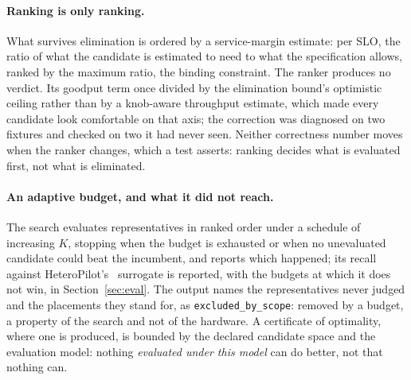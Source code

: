 \paragraph{Ranking is only ranking.}
What survives elimination is ordered by a service-margin estimate: per SLO,
the ratio of what the candidate is estimated to need to what the specification
allows, ranked by the maximum ratio, the binding constraint. The ranker
produces no verdict. Its goodput term once divided by the elimination bound's
optimistic ceiling rather than by a knob-aware throughput estimate, which made
every candidate look comfortable on that axis; the correction was diagnosed on
two fixtures and checked on two it had never seen. Neither correctness number
moves when the ranker changes, which a test asserts: ranking decides what is
evaluated first, not what is eliminated.

\paragraph{An adaptive budget, and what it did not reach.}
The search evaluates representatives in ranked order under a schedule of
increasing $K$, stopping when the budget is exhausted or when no unevaluated
candidate could beat the incumbent, and reports which happened; its recall
against HeteroPilot's~\cite{heteropilot} surrogate is reported, with the budgets at
which it does not win, in Section~\ref{sec:eval}. The output names the
representatives never judged and the placements they stand for, as
\texttt{excluded\_by\_scope}: removed by a budget, a property of the search
and not of the hardware. A certificate of optimality, where one is produced,
is bounded by the declared candidate space and the evaluation model: nothing
\emph{evaluated under this model} can do better, not that nothing can.
